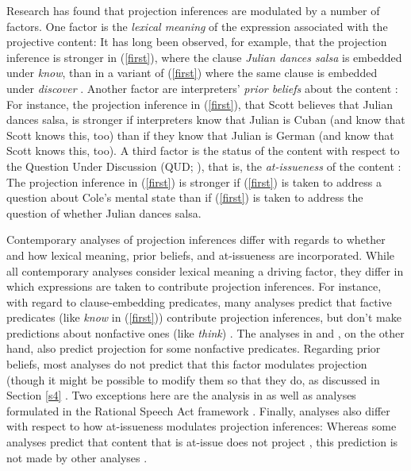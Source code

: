 \documentclass[11pt,fleqn]{article}
\newcommand{\6}{\mbox{$[\hspace*{-.6mm}[$}}
\newcommand{\9}{\mbox{$]\hspace*{-.6mm}]$}}
\begin{document}
Research has found that projection inferences are modulated by a number of factors. One factor is the \emph{lexical meaning} of the expression associated with the projective content: It has long been observed, for example, that the projection inference is stronger in (\ref{first}), where the clause {\em Julian dances salsa} is embedded under {\em know}, than in a variant of (\ref{first}) where the same clause is embedded  under {\em discover} \citep[e.g.,][]{karttunen71b,tbd-variability,degen-tonhauser-language}. Another factor are interpreters' \emph{prior beliefs} about the content \citep[e.g.,][]{mahler2020,degen-tonhauser-openmind,scontras-tonhauser2025}: For instance, the projection inference in (\ref{first}), that Scott believes that Julian dances salsa, is stronger if interpreters know that Julian is Cuban (and know that Scott knows this, too) than if they know that Julian is German (and know that Scott knows this, too). A third factor is the status of the content with respect to the Question Under Discussion (QUD; \citealt{roberts12}), that is, the \emph{at-issueness} of the content \citep[e.g.,][]{brst-salt10,best-question,cummins-rohde2015,tonhauser-salt26,tbd-variability,djaerv-bacovcin-salt27,djaerv-bacovcin2020,scontras-tonhauser2025}: The projection inference in (\ref{first}) is stronger if (\ref{first}) is taken to address a question about Cole's mental state than if (\ref{first}) is taken to address the question of whether Julian dances salsa.

Contemporary analyses of projection inferences differ with regards to whether and how lexical meaning, prior beliefs, and at-issueness are incorporated. While all contemporary analyses consider lexical meaning a driving factor, they differ in which expressions are taken to contribute projection inferences. For instance, with regard to clause-embedding predicates, many analyses predict that factive predicates (like {\em know} in (\ref{first})) contribute projection inferences, but don't make predictions about nonfactive ones (like {\em think}) \citep[e.g.,][]{heim83,vds92,abrusan2011,abrusan2016}. The analyses in \cite{schlenker2021} and \cite{scontras-tonhauser2025}, on the other hand, also predict projection for some nonfactive predicates. Regarding prior beliefs, most analyses do not predict that this factor modulates projection (though it might be possible to modify them so that they do, as discussed in Section \ref{s4} \citep[e.g.,][]{heim83,vds92,abrusan2011,abrusan2016,best-question}. Two exceptions here are the analysis in \cite{schlenker2021} as well as analyses formulated in the Rational Speech Act framework \citep[e.g.,][]{qing-etal2016,warstadt2022,scontras-tonhauser2025}. Finally, analyses also differ with respect to how at-issueness modulates projection inferences: Whereas some analyses predict that content that is at-issue does not project \citep[e.g.,][]{abrusan2011,abrusan2016,best-question}, this prediction is not made by other analyses \citep[e.g.,][]{heim83,djaerv-bacovcin2020,schlenker2021}. 
\end{document}
